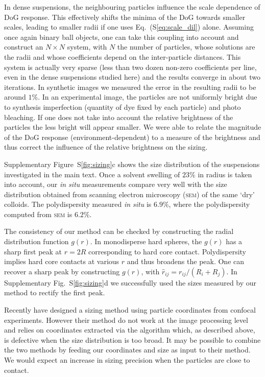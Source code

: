 \documentclass[prl,twocolumn,notitlepage]{revtex4-1}
\begin{document}
In dense suspensions, the neighbouring particles influence the scale dependence of DoG response. This effectively shifts the minima of the DoG towards smaller scales, leading to smaller radii if one uses Eq.~(S\ref{eq:scale_dil}) alone. Assuming once again binary ball objects, one can take this coupling into account and construct an $N\times N$ system, with $N$ the number of particles, whose solutions are the radii and whose coefficients depend on the inter-particle distances. This system is actually very sparse (less than two dozen non-zero coefficients per line, even in the dense suspensions studied here) and the results converge in about two iterations. In synthetic images we measured the error in the resulting radii to be around $1\%$. In an experimental image, the particles are not uniformly bright due to synthesis imperfection (quantity of dye fixed by each particle) and photo bleaching. If one does not take into account the relative brightness of the particles the less bright will appear smaller. We were able to relate the magnitude of the DoG response (environment-dependent) to a measure of the brightness and thus correct the influence of the relative brightness on the sizing.

Supplementary Figure~S\ref{fig:sizing}c shows the size distribution of the suspensions investigated in the main text. Once a solvent swelling of $23\%$ in radius is taken into account, our \emph{in situ} measurements compare very well with the size distribution obtained from scanning electron microscopy (\textsc{sem}) of the same `dry' colloids. The polydispersity measured \emph{in situ} is $6.9\%$, where the polydispersity computed from \textsc{sem} is $6.2\%$.

The consistency of our method can be checked by constructing the radial distribution function $g(r)$. In monodisperse hard spheres, the $g(r)$ has a sharp first peak at $r=2R$ corresponding to hard core contact. Polydispersity implies hard core contacts at various $r$ and thus broadens the peak. One can recover a sharp peak by constructing $g(\hat{r})$, with $\hat{r}_{ij} = r_{ij}/(R_i+R_j)$. In Supplementary Fig.~S\ref{fig:sizing}d we successfully used the sizes measured by our method to rectify the first peak.

Recently \citet{Kurita2011,Kurita2011b} have designed a sizing method using particle coordinates from confocal experiments. However their method do not work at the image processing level and relies on coordinates extracted via the \citet{Crocker1996} algorithm which, as described above, is defective when the size distribution is too broad. It may be possible to combine the two methods by feeding our coordinates and size as input to their method. We would expect an increase in sizing precision when the particles are close to contact.
\end{document}
